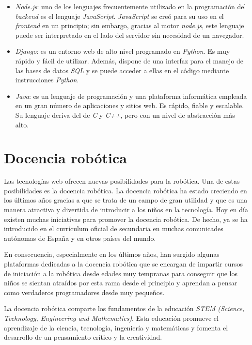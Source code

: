 \begin{itemize}
    \item \textit{Node.js}: uno de los lenguajes frecuentemente utilizado en la programación del \textit{backend} es el lenguaje \textit{JavaScript}. \textit{JavaScript} se creó para su uso en el \textit{frontend} en un principio; sin embargo, gracias al motor \textit{node.js}, este lenguaje puede ser interpretado en el lado del servidor sin necesidad de un navegador.
    \item \textit{Django}: es un entorno web de alto nivel programado en \textit{Python}. Es muy rápido y fácil de utilizar. Además, dispone de una interfaz para el manejo de las bases de datos \textit{SQL} y se puede acceder a ellas en el código mediante instrucciones \textit{Python}.
    \item \textit{Java}: es un lenguaje de programación y una plataforma informática empleada en un gran número de aplicaciones y sitios web. Es rápido, fiable y escalable. Su lenguaje deriva del de \textit{C} y \textit{C++}, pero con un nivel de abstracción más alto.
\end{itemize}


\section{Docencia robótica}
Las tecnologías web ofrecen nuevas posibilidades para la robótica. Una de estas posibilidades es la docencia robótica. La docencia robótica ha estado creciendo en los últimos años gracias a que se trata de un campo de gran utilidad y que es una manera atractiva y divertida de introducir a los niños en la tecnología. Hoy en día existen muchas iniciativas para promover la docencia robótica. De hecho, ya se ha introducido en el currículum oficial de secundaria en muchas comunicades autónomas de España y en otros países del mundo.  \newline

En consecuencia, especialmente en los últimos años, han surgido algunas plataformas dedicadas a la docencia robótica que se encargan de impartir cursos de iniciación a la robótica desde edades muy tempranas para conseguir que los niños se sientan atraídos por esta rama desde el principio y aprendan a pensar como verdaderos programadores desde muy pequeños. \newline

La docencia robótica comparte los fundamentos de la educación \textit{STEM (Science, Technology, Engineering and Mathematics)}. Esta educación promueve el aprendizaje de la ciencia, tecnología, ingeniería y matemáticas y fomenta el desarrollo de un pensamiento crítico y la creatividad. \newline

